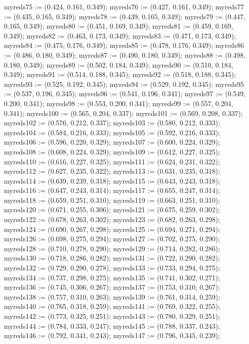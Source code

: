 myreds75 := (0.424, 0.161, 0.349);
myreds76 := (0.427, 0.161, 0.349);
myreds77 := (0.435, 0.165, 0.349);
myreds78 := (0.439, 0.165, 0.349);
myreds79 := (0.447, 0.165, 0.349);
myreds80 := (0.451, 0.169, 0.349);
myreds81 := (0.459, 0.169, 0.349);
myreds82 := (0.463, 0.173, 0.349);
myreds83 := (0.471, 0.173, 0.349);
myreds84 := (0.475, 0.176, 0.349);
myreds85 := (0.478, 0.176, 0.349);
myreds86 := (0.486, 0.180, 0.349);
myreds87 := (0.490, 0.180, 0.349);
myreds88 := (0.498, 0.180, 0.349);
myreds89 := (0.502, 0.184, 0.349);
myreds90 := (0.510, 0.184, 0.349);
myreds91 := (0.514, 0.188, 0.345);
myreds92 := (0.518, 0.188, 0.345);
myreds93 := (0.525, 0.192, 0.345);
myreds94 := (0.529, 0.192, 0.345);
myreds95 := (0.537, 0.196, 0.345);
myreds96 := (0.541, 0.196, 0.341);
myreds97 := (0.549, 0.200, 0.341);
myreds98 := (0.553, 0.200, 0.341);
myreds99 := (0.557, 0.204, 0.341);
myreds100 := (0.565, 0.204, 0.337);
myreds101 := (0.569, 0.208, 0.337);
myreds102 := (0.576, 0.212, 0.337);
myreds103 := (0.580, 0.212, 0.333);
myreds104 := (0.584, 0.216, 0.333);
myreds105 := (0.592, 0.216, 0.333);
myreds106 := (0.596, 0.220, 0.329);
myreds107 := (0.600, 0.224, 0.329);
myreds108 := (0.608, 0.224, 0.329);
myreds109 := (0.612, 0.227, 0.325);
myreds110 := (0.616, 0.227, 0.325);
myreds111 := (0.624, 0.231, 0.322);
myreds112 := (0.627, 0.235, 0.322);
myreds113 := (0.631, 0.235, 0.318);
myreds114 := (0.639, 0.239, 0.318);
myreds115 := (0.643, 0.243, 0.318);
myreds116 := (0.647, 0.243, 0.314);
myreds117 := (0.655, 0.247, 0.314);
myreds118 := (0.659, 0.251, 0.310);
myreds119 := (0.663, 0.251, 0.310);
myreds120 := (0.671, 0.255, 0.306);
myreds121 := (0.675, 0.259, 0.302);
myreds122 := (0.678, 0.263, 0.302);
myreds123 := (0.682, 0.263, 0.298);
myreds124 := (0.690, 0.267, 0.298);
myreds125 := (0.694, 0.271, 0.294);
myreds126 := (0.698, 0.275, 0.294);
myreds127 := (0.702, 0.275, 0.290);
myreds128 := (0.710, 0.278, 0.290);
myreds129 := (0.714, 0.282, 0.286);
myreds130 := (0.718, 0.286, 0.282);
myreds131 := (0.722, 0.290, 0.282);
myreds132 := (0.729, 0.290, 0.278);
myreds133 := (0.733, 0.294, 0.275);
myreds134 := (0.737, 0.298, 0.275);
myreds135 := (0.741, 0.302, 0.271);
myreds136 := (0.745, 0.306, 0.267);
myreds137 := (0.753, 0.310, 0.267);
myreds138 := (0.757, 0.310, 0.263);
myreds139 := (0.761, 0.314, 0.259);
myreds140 := (0.765, 0.318, 0.259);
myreds141 := (0.769, 0.322, 0.255);
myreds142 := (0.773, 0.325, 0.251);
myreds143 := (0.780, 0.329, 0.251);
myreds144 := (0.784, 0.333, 0.247);
myreds145 := (0.788, 0.337, 0.243);
myreds146 := (0.792, 0.341, 0.243);
myreds147 := (0.796, 0.345, 0.239);
